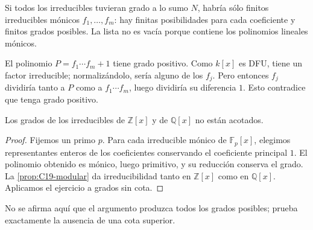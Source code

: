 \begin{sol}
Si todos los irreducibles tuvieran grado a lo sumo $N$, habría sólo finitos irreducibles mónicos $f_1,\ldots,f_m$: hay finitas posibilidades para cada coeficiente y finitos grados posibles. La lista no es vacía porque contiene los polinomios lineales mónicos.

El polinomio $P=f_1\cdots f_m+1$ tiene grado positivo. Como $k[x]$ es DFU, tiene un factor irreducible; normalizándolo, sería alguno de los $f_j$. Pero entonces $f_j$ dividiría tanto a $P$ como a $f_1\cdots f_m$, luego dividiría su diferencia $1$. Esto contradice que tenga grado positivo.
\end{sol}
\begin{coro}
Los grados de los irreducibles de $\mathbb Z[x]$ y de $\mathbb Q[x]$ no están acotados.
\end{coro}
\begin{proof}
Fijemos un primo $p$. Para cada irreducible mónico de $\mathbb F_p[x]$, elegimos representantes enteros de los coeficientes conservando el coeficiente principal $1$. El polinomio obtenido es mónico, luego primitivo, y su reducción conserva el grado. La \cref{prop:C19-modular} da irreducibilidad tanto en $\mathbb Z[x]$ como en $\mathbb Q[x]$. Aplicamos el ejercicio a grados sin cota.
\end{proof}
No se afirma aquí que el argumento produzca todos los grados posibles; prueba exactamente la ausencia de una cota superior.

